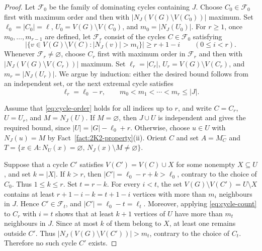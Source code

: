 \documentclass[11pt]{article}
\numberwithin{equation}{section}
\theoremstyle{plain}
\theoremstyle{definition}
\theoremstyle{plain}
\begin{document}
\begin{proof}
Let $\mathcal F_0$ be the family of dominating cycles containing $J$.
Choose $C_0\in\mathcal F_0$ first with maximum order and then
with $|N_J(V(G)\setminus V(C_0))|$ maximum.   Set
$\ell_0=|C_0|=\ell$, $U_0=V(G)\setminus V(C_0)$, and
$m_0=|N_J(U_0)|$.
For $r\geq1$, once $m_0,\ldots,m_{r-1}$ are defined, let
$\mathcal F_r$ consist of the cycles $C\in\mathcal F_0$ satisfying
\begin{equation}\label{eq:cycle-count}
    \bigl|\{v\in V(G)\setminus V(C):|N_J(v)|>m_i\}\bigr|
    \geq r+1-i \qquad (0\leq i<r).
\end{equation}
Whenever $\mathcal F_r\neq\varnothing$, choose $C_r$ first
with maximum order in $\mathcal F_r$ and then with
$|N_J(V(G)\setminus V(C_r))|$ maximum.   Set
$\ell_r=|C_r|$, $U_r=V(G)\setminus V(C_r)$, and $m_r=|N_J(U_r)|$.
We argue by induction: either the desired bound follows from an
independent set, or the next extremal cycle satisfies
\begin{equation}\label{eq:cycle-order}
    \ell_r=\ell_0-r,\qquad
    m_0<m_1<\cdots<m_r\leq|J|.
\end{equation}

Assume that \eqref{eq:cycle-order} holds for all indices up to $r$,
and write $C=C_r$, $U=U_r$, and $M=N_J(U)$.
If $M=\varnothing$, then $J\cup U$ is independent and gives the
required bound, since $|U|=|G|-\ell_0+r$. Otherwise, choose $u\in U$ with $N_J(u)=M$ by
Fact~\ref{fact:2K2-property}\textup{(ii)}. Orient $C$ and   set
$A=M_C^-$ and
$T=\{x\in A:N_U(x)=\varnothing,\,
N_J(x)\setminus M\neq\varnothing\}$.


Suppose that a cycle $C'$ satisfies
    $V(C')=V(C)\cup X$
for some nonempty $X\subseteq U$, and   set $k=|X|$.
If $k>r$, then
    $|C'|=\ell_0-r+k>\ell_0$,
contrary to the choice of $C_0$.
Thus $1\leq k\leq r$.   Set $t=r-k$.
For every $i<t$, the set $V(G)\setminus V(C')=U\setminus X$
contains at least
   $ r+1-i-k=t+1-i$
vertices with more than $m_i$ neighbours in $J$.
Hence $C'\in\mathcal F_t$, and
    $|C'|=\ell_0-t=\ell_t$.
Moreover, applying \eqref{eq:cycle-count} to $C_r$ with $i=t$
shows that at least $k+1$ vertices of $U$ have more than $m_t$
neighbours in $J$. Since at most $k$ of them belong to $X$,
at least one remains outside $C'$. Thus
    $|N_J(V(G)\setminus V(C'))|>m_t$,
contrary to the choice of $C_t$. Therefore no such cycle $C'$
exists.


\end{proof}
\end{document}
